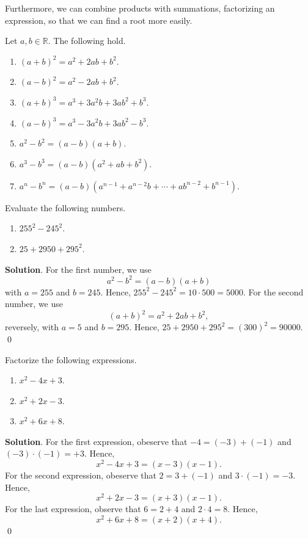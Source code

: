 \documentclass[11pt]{book}
\theoremstyle{break}
\theoremstyle{no_label}
\newcommand{\bbR}{\mathbb{R}}
\numberwithin{equation}{section}
\begin{document}
Furthermore, we can combine products with summations, factorizing an expression, so that we can find a root more easily.

\begin{theorem}[Factorization]
    Let $a, b\in\bbR$. The following hold.
    \begin{enumerate}
        \item $(a+b)^2=a^2+2ab+b^2$.
        \item $(a-b)^2=a^2-2ab+b^2$.
        \item $(a+b)^3=a^3+3a^2b+3ab^2+b^3$.
        \item $(a-b)^3=a^3-3a^2b+3ab^2-b^3$.
        \item $a^2-b^2=(a-b)(a+b)$.
        \item $a^3-b^3=(a-b)(a^2+ab+b^2)$.
        \item $a^n-b^n=(a-b)(a^{n-1}+a^{n-2}b+\cdots+ab^{n-2}+b^{n-1})$.
    \end{enumerate}
\end{theorem}

\begin{example}
    Evaluate the following numbers.
    \begin{enumerate}
        \item $255^2-245^2$.
        \item $25+2950+295^2$.
    \end{enumerate}
\end{example}
\textbf{Solution}. For the first number, we use $$a^2-b^2=(a-b)(a+b)$$ with $a=255$ and $b=245$. Hence, $255^2-245^2=10\cdot500=5000$. For the second number, we use $$(a+b)^2=a^2+2ab+b^2,$$ reversely, with $a=5$ and $b=295$. Hence, $25+2950+295^2=(300)^2=90000$. \qed

\begin{example}
    Factorize the following expressions.
    \begin{enumerate}
        \item $x^2-4x+3$.
        \item $x^2+2x-3$.
        \item $x^2+6x+8$.
    \end{enumerate}
\end{example}
\textbf{Solution}. For the first expression, obeserve that $-4=(-3)+(-1)$ and $(-3)\cdot(-1)=+3$. Hence, $$x^2-4x+3=(x-3)(x-1).$$ For the second expression, obeserve that $2=3+(-1)$ and $3\cdot(-1)=-3$. Hence, $$x^2+2x-3=(x+3)(x-1).$$ For the last expression, observe that $6=2+4$ and $2\cdot4=8$. Hence, $$x^2+6x+8=(x+2)(x+4).$$ \qed
\end{document}
